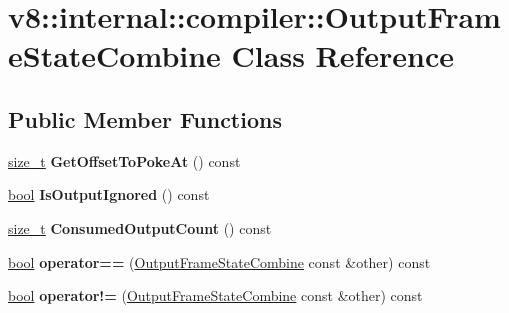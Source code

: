 \hypertarget{classv8_1_1internal_1_1compiler_1_1OutputFrameStateCombine}{}\section{v8\+:\+:internal\+:\+:compiler\+:\+:Output\+Frame\+State\+Combine Class Reference}
\label{classv8_1_1internal_1_1compiler_1_1OutputFrameStateCombine}
\subsection*{Public Member Functions}
\begin{DoxyCompactItemize}
\item 
\mbox{\label{classv8_1_1internal_1_1compiler_1_1OutputFrameStateCombine_a95bbeeabf0b8eeb81fd1b08b9281c4e9}} 
\mbox{\hyperlink{classsize__t}{size\+\_\+t}} {\bfseries Get\+Offset\+To\+Poke\+At} () const
\item 
\mbox{\label{classv8_1_1internal_1_1compiler_1_1OutputFrameStateCombine_ad5c9233e72ed1b80170f23acee83660c}} 
\mbox{\hyperlink{classbool}{bool}} {\bfseries Is\+Output\+Ignored} () const
\item 
\mbox{\label{classv8_1_1internal_1_1compiler_1_1OutputFrameStateCombine_a1bcb8bee30077f706467d6fc629635ca}} 
\mbox{\hyperlink{classsize__t}{size\+\_\+t}} {\bfseries Consumed\+Output\+Count} () const
\item 
\mbox{\label{classv8_1_1internal_1_1compiler_1_1OutputFrameStateCombine_ae5302235b8aac3a9506d7870a2276403}} 
\mbox{\hyperlink{classbool}{bool}} {\bfseries operator==} (\mbox{\hyperlink{classv8_1_1internal_1_1compiler_1_1OutputFrameStateCombine}{Output\+Frame\+State\+Combine}} const \&other) const
\item 
\mbox{\label{classv8_1_1internal_1_1compiler_1_1OutputFrameStateCombine_ae5dd9cd948539c13e07a747abd815ce5}} 
\mbox{\hyperlink{classbool}{bool}} {\bfseries operator!=} (\mbox{\hyperlink{classv8_1_1internal_1_1compiler_1_1OutputFrameStateCombine}{Output\+Frame\+State\+Combine}} const \&other) const
\end{DoxyCompactItemize}
